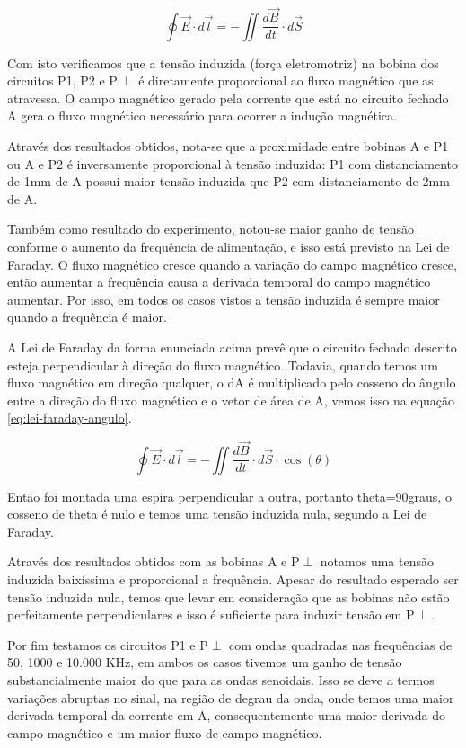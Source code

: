 \documentclass[12pt]{article}
\begin{document}
\begin{equation}
  \label{eq:lei-faraday}
  \oint \vec{E} \cdot d\vec{l} = -\iint \frac{d\vec{B}}{dt}   \cdot d\vec{S}
\end{equation}

Com isto verificamos que a tensão induzida (força eletromotriz) na
bobina dos circuitos P1, P2 e P$\perp$ é diretamente proporcional ao  fluxo
magnético que as atravessa. O campo magnético gerado pela corrente
que está no circuito fechado A gera o fluxo magnético necessário para
ocorrer a indução magnética.

Através dos resultados obtidos, nota-se que a proximidade entre
bobinas A e P1 ou A e P2 é inversamente proporcional à tensão
induzida: P1 com distanciamento de 1mm de A possui maior tensão
induzida que P2 com distanciamento de 2mm de A.

Também como resultado do experimento, notou-se maior ganho de tensão
conforme o aumento da frequência de alimentação, e isso está previsto
na Lei de Faraday. O fluxo magnético cresce quando a variação do
campo magnético cresce, então aumentar a frequência causa a derivada
temporal do campo magnético aumentar. Por isso, em todos os casos
vistos a tensão induzida é sempre maior quando a frequência é maior.

A Lei de Faraday da forma enunciada acima prevê que o circuito
fechado descrito esteja perpendicular à direção do fluxo magnético.
Todavia, quando temos um fluxo magnético em direção qualquer, o dA é
multiplicado pelo cosseno do ângulo entre a direção do fluxo
magnético e o vetor de área de A, vemos isso na equação
\ref{eq:lei-faraday-angulo}.

\begin{equation}
  \label{eq:lei-faraday-angulo}
  \oint \vec{E} \cdot d\vec{l} = -\iint \frac{d\vec{B}}{dt}   \cdot
  d\vec{S} \cdot \cos(\theta)
\end{equation}

Então foi montada uma espira perpendicular a outra, portanto
theta=90graus, o cosseno de theta é nulo e temos uma tensão induzida
nula, segundo a Lei de Faraday.

Através dos resultados obtidos com as bobinas A e P$\perp$ notamos uma
tensão induzida baixíssima e proporcional a frequência. Apesar do
resultado esperado ser tensão induzida nula, temos que levar em
consideração que as bobinas não estão perfeitamente perpendiculares e
isso é suficiente para induzir tensão em P$\perp$.

Por fim testamos os circuitos P1 e P$\perp$ com ondas quadradas nas
frequências de 50, 1000 e 10.000 KHz, em ambos os casos tivemos um
ganho de tensão substancialmente maior do que para as ondas
senoidais. Isso se deve a termos variações abruptas no sinal, na
região de degrau da onda, onde temos uma maior derivada temporal da
corrente em A, consequentemente uma maior derivada do campo magnético
e um maior fluxo de campo magnético.
\end{document}
